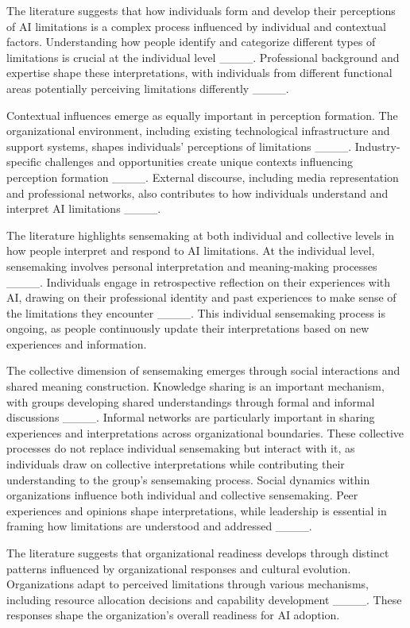 The literature suggests that how individuals form and develop their perceptions of AI limitations is a complex process influenced by individual and contextual factors. Understanding how people identify and categorize different types of limitations is crucial at the individual level ____. Professional background and expertise shape these interpretations, with individuals from different functional areas potentially perceiving limitations differently ____.

Contextual influences emerge as equally important in perception formation. The organizational environment, including existing technological infrastructure and support systems, shapes individuals' perceptions of limitations ____. Industry-specific challenges and opportunities create unique contexts influencing perception formation ____. External discourse, including media representation and professional networks, also contributes to how individuals understand and interpret AI limitations ____.

The literature highlights sensemaking at both individual and collective levels in how people interpret and respond to AI limitations. At the individual level, sensemaking involves personal interpretation and meaning-making processes ____. Individuals engage in retrospective reflection on their experiences with AI, drawing on their professional identity and past experiences to make sense of the limitations they encounter ____. This individual sensemaking process is ongoing, as people continuously update their interpretations based on new experiences and information.

The collective dimension of sensemaking emerges through social interactions and shared meaning construction. Knowledge sharing is an important mechanism, with groups developing shared understandings through formal and informal discussions ____. Informal networks are particularly important in sharing experiences and interpretations across organizational boundaries. These collective processes do not replace individual sensemaking but interact with it, as individuals draw on collective interpretations while contributing their understanding to the group's sensemaking process. Social dynamics within organizations influence both individual and collective sensemaking. Peer experiences and opinions shape interpretations, while leadership is essential in framing how limitations are understood and addressed ____.

The literature suggests that organizational readiness develops through distinct patterns influenced by organizational responses and cultural evolution. Organizations adapt to perceived limitations through various mechanisms, including resource allocation decisions and capability development ____. These responses shape the organization's overall readiness for AI adoption.

